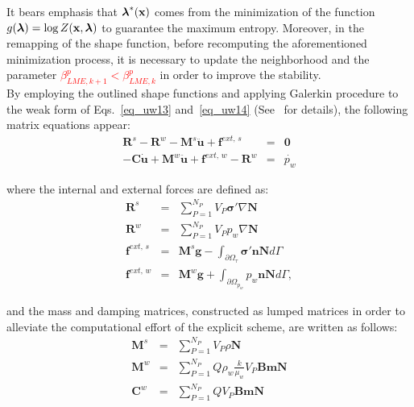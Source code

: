 \documentclass[twocolumn]{svjour3}          %
\begin{document}
It bears emphasis that $\boldsymbol{\lambda}^*(\bf x)$ comes from the minimization of the function $g(\boldsymbol{\lambda})=\log Z(\bf x, \boldsymbol{\lambda})$ to guarantee the maximum entropy. Moreover, in the remapping of the shape function, before recomputing the aforementioned minimization process, it is necessary to update the neighborhood and the parameter \textcolor{red}{$\beta_{LME,k+1}^p < \beta_{LME,k}^p$} in order to improve the stability.\\

By employing the outlined shape functions and applying Galerkin procedure to the weak form of Eqs.~\eqref{eq_uw13} and~\eqref{eq_uw14}
 (See~\cite{Sanavia:02,Sanavia:06} for details), the following matrix equations appear:
 \begin{eqnarray}
 \boldsymbol{R}^s- \boldsymbol{R}^w- \boldsymbol{M}^s \ddot{\boldsymbol{u}} + \boldsymbol{f}^{ext, \, s} &=& \boldsymbol{0} \label{mat1}\\
- \boldsymbol{C} \dot{\boldsymbol{u}} + \boldsymbol{M}^w \ddot{\boldsymbol{u}} + \boldsymbol{f}^{ext, \, w}-\boldsymbol{R}^{w}
  \label{mat2} &=& \dot{p_w}
 \end{eqnarray}
 
 where the internal and external forces are defined as:
 \begin{eqnarray}
  \boldsymbol{R}^s &=& \sum_{P=1}^{N_{P}} V_{P} \boldsymbol{\sigma'} \nabla \mathbf{N} \nonumber \\
    \boldsymbol{R}^w &=& \sum_{P=1}^{N_{P}} V_{P} p_w \nabla \mathbf{N} \nonumber \\
  \boldsymbol{f}^{ext, \, s} &=& \boldsymbol{M}^s \boldsymbol{g} - \int_{\partial \Omega_{\tau}} \boldsymbol{\sigma'} \boldsymbol{n}\mathbf{N} d \Gamma\nonumber \\
 \boldsymbol{f}^{ext, \, w} &=& \boldsymbol{M}^w \boldsymbol{g} + \int_{\partial \Omega_{p_w}} p_w \boldsymbol{n} \mathbf{N} d \Gamma, \nonumber
  \end{eqnarray}
  
  and the mass and damping matrices, constructed as lumped matrices in order to alleviate the computational effort of the explicit scheme, are written as follows:
   \begin{eqnarray}
  \boldsymbol{M}^s &=& \sum_{P=1}^{N_{P}} V_{P} \rho \mathbf{N} \nonumber \\
    \boldsymbol{M}^w &=& \sum_{P=1}^{N_{P}} Q \rho_w \frac{k}{\mu_w} V_{P} \mathbf{B}\mathbf{m} \mathbf{N} \nonumber \\
        \boldsymbol{C}^w &=& \sum_{P=1}^{N_{P}} Q V_{P} \mathbf{B}\mathbf{m} \mathbf{N} \nonumber
  \end{eqnarray}
  
\end{document}
